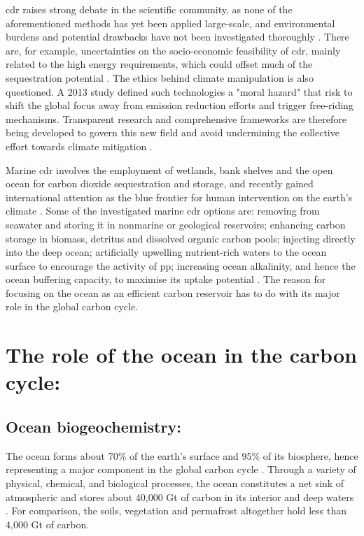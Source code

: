\ac{cdr} raises strong debate in the scientific community, as none of the aforementioned methods has yet been applied large-scale, and environmental burdens and potential drawbacks have not been investigated thoroughly \citep{terlouw2021life}. There are, for example, uncertainties on the socio-economic feasibility of \ac{cdr}, mainly related to the high energy requirements, which could offset much of the  sequestration potential \citep{kheshgi1995sequestering}. The ethics behind climate manipulation is also questioned. A 2013 study defined such technologies a "moral hazard" that risk to shift the global focus away from emission reduction efforts \citep{preston2013ethics} and trigger free-riding mechanisms. Transparent research and comprehensive frameworks are therefore being developed to govern this new field and avoid undermining the collective effort towards climate mitigation \citep{honegger2021paying}.

Marine \ac{cdr} involves the employment of wetlands, bank shelves and the open ocean for carbon dioxide sequestration and storage, and recently gained international attention as the blue frontier for human intervention on the earth's climate \citep{boettcher2021navigating}. Some of the investigated marine \ac{cdr} options are: removing  from seawater and storing it in nonmarine or geological reservoirs; enhancing carbon storage in biomass, detritus and dissolved organic carbon pools; injecting  directly into the deep ocean; artificially upwelling nutrient-rich waters to the ocean surface to encourage the activity of \ac{pp}; increasing ocean alkalinity, and hence the ocean buffering capacity, to maximise its uptake potential \citep{NAP26278}. The reason for focusing on the ocean as an efficient carbon reservoir has to do with its major role in the global carbon cycle.

\section{The role of the ocean in the carbon cycle:}

\subsection{Ocean biogeochemistry:}

The ocean forms about 70\% of the earth's surface and 95\% of its biosphere, hence representing a major component in the global carbon cycle \citep{ma2015primary}. Through a variety of physical, chemical, and biological processes, the ocean constitutes a net sink of atmospheric  and stores about 40,000 Gt of carbon in its interior and deep waters \citep{wang2023simulated}. For comparison, the soils, vegetation and permafrost altogether hold less than 4,000 Gt of carbon. 

